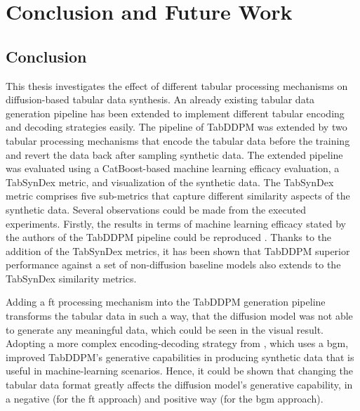 \chapter{Conclusion and Future Work}
\label{ch:conclusion}

\section{Conclusion}
\label{ch:conclusion_}

This thesis investigates the effect of different tabular processing mechanisms on diffusion-based tabular data synthesis.
An already existing tabular data generation pipeline has been extended to implement different tabular encoding and decoding strategies easily.
The pipeline of TabDDPM \cite{kotelnikov2022TabDDPMModellingTabular} was extended by two tabular processing mechanisms that encode the tabular data before the training and revert the data back after sampling synthetic data.
The extended pipeline was evaluated using a CatBoost-based machine learning efficacy evaluation, a TabSynDex metric, and visualization of the synthetic data.
The TabSynDex metric comprises five sub-metrics that capture different similarity aspects of the synthetic data.
Several observations could be made from the executed experiments.
Firstly, the results in terms of machine learning efficacy stated by the authors of the TabDDPM pipeline could be reproduced \cite{kotelnikov2022TabDDPMModellingTabular}.
Thanks to the addition of the TabSynDex metrics, it has been shown that TabDDPM superior performance against a set of non-diffusion baseline models also extends to the TabSynDex similarity metrics.

Adding a \acrfull{ft} processing mechanism into the TabDDPM generation pipeline transforms the tabular data in such a way,
that the diffusion \gls{model} was not able to generate any meaningful data, which could be seen in the visual result.
Adopting a more complex encoding-decoding strategy from \cite{zhao2022CTABGANEnhancingTabular}, which uses a \acrfull{bgm},
improved TabDDPM's generative capabilities in producing synthetic data that is useful in machine-learning scenarios.
Hence, it could be shown that changing the tabular data format greatly affects the diffusion \gls{model}'s generative capability, in a negative (for the \gls{ft} approach) and positive way (for the \gls{bgm} approach).

